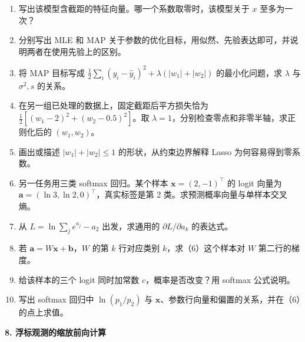 \begin{enumerate}[label=(\arabic*)]
\item 写出该模型含截距的特征向量。哪一个系数取零时，该模型关于 $x$ 至多为一次？
\item 分别写出 MLE 和 MAP 关于参数的优化目标，用似然、先验表达即可，并说明两者在使用先验上的区别。
\item 将 MAP 目标写成 $\frac12\sum_i(y_i-\hat y_i)^2+\lambda(|w_1|+|w_2|)$ 的最小化问题，求 $\lambda$ 与 $\sigma^2,s$ 的关系。
\item 在另一组已处理的数据上，固定截距后平方损失恰为 $\frac12[(w_1-2)^2+(w_2-0.5)^2]$。取 $\lambda=1$，分别检查零点和非零半轴，求正则化后的 $(w_1,w_2)$。
\item 画出或描述 $|w_1|+|w_2|\le1$ 的形状，从约束边界解释 Lasso 为何容易得到零系数。
\item 另一任务用三类 softmax 回归。某个样本 $\bm x=(2,-1)^\top$ 的 logit 向量为 $\bm a=(\ln 3,\ln 2,0)^\top$，真实标签是第 2 类。求预测概率向量与单样本交叉熵。
\item 从 $L=\ln\sum_j e^{a_j}-a_2$ 出发，求通用的 $\partial L/\partial a_k$ 的表达式。
\item 若 $\bm a=W\bm x+\bm b$，$W$ 的第 $k$ 行对应类别 $k$，求（6）这个样本对 $W$ 第二行的梯度。
\item 给该样本的三个 logit 同时加常数 $c$，概率是否改变？用 softmax 公式说明。
\item 写出 softmax 回归中 $\ln(p_1/p_2)$ 与 $\bm x$、参数行向量和偏置的关系，并在（6）的点上求值。
\end{enumerate}

\noindent\textbf{8. 浮标观测的缩放前向计算}

